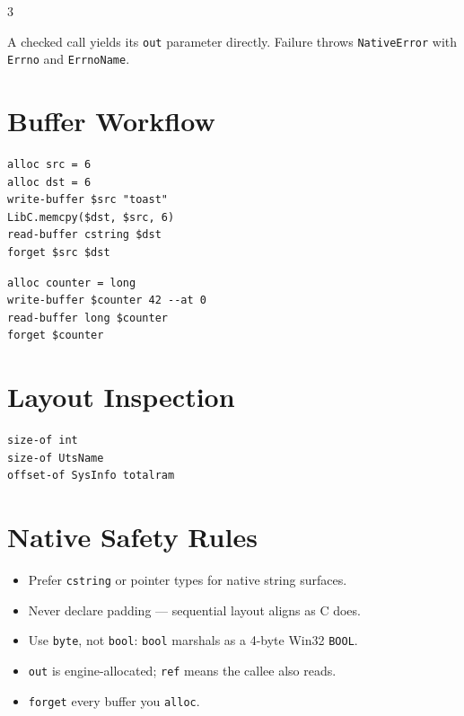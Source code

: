 \begin{multicols*}{3}

A checked call yields its \texttt{out} parameter directly. Failure throws
\texttt{NativeError} with \texttt{Errno} and \texttt{ErrnoName}.

\section{Buffer Workflow}
\begin{lstlisting}
alloc src = 6
alloc dst = 6
write-buffer $src "toast"
LibC.memcpy($dst, $src, 6)
read-buffer cstring $dst
forget $src $dst
\end{lstlisting}

\begin{lstlisting}
alloc counter = long
write-buffer $counter 42 --at 0
read-buffer long $counter
forget $counter
\end{lstlisting}

\section{Layout Inspection}
\begin{lstlisting}
size-of int
size-of UtsName
offset-of SysInfo totalram
\end{lstlisting}

\section{Native Safety Rules}
\begin{itemize}
\item Prefer \texttt{cstring} or pointer types for native string surfaces.
\item Never declare padding --- sequential layout aligns as C does.
\item Use \texttt{byte}, not \texttt{bool}: \texttt{bool} marshals as a 4-byte Win32 \texttt{BOOL}.
\item \texttt{out} is engine-allocated; \texttt{ref} means the callee also reads.
\item \texttt{forget} every buffer you \texttt{alloc}.
\end{itemize}


\end{multicols*}

